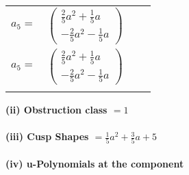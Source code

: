 \documentclass[1p]{elsarticle_modified}
\theoremstyle{definition}
\begin{document}
\begin{tabular}{m{7pt} m{180pt} m{7pt} m{180pt} }
\flushright $a_{5}=$&$\begin{pmatrix}\frac{2}{5} a^2+\frac{1}{5} a\\-\frac{2}{5} a^2-\frac{1}{5} a\end{pmatrix}$\\ \flushright $a_{5}=$&$\begin{pmatrix}\frac{2}{5} a^2+\frac{1}{5} a\\-\frac{2}{5} a^2-\frac{1}{5} a\end{pmatrix}$\\&\end{tabular}
\flushleft \textbf{(ii) Obstruction class $= 1$}\\~\\
\flushleft \textbf{(iii) Cusp Shapes $= \frac{1}{5} a^2+\frac{3}{5} a+5$}\\~\\
\newpage\renewcommand{\arraystretch}{1}
\flushleft \textbf{(iv) u-Polynomials at the component}\newline \\
\end{document}
